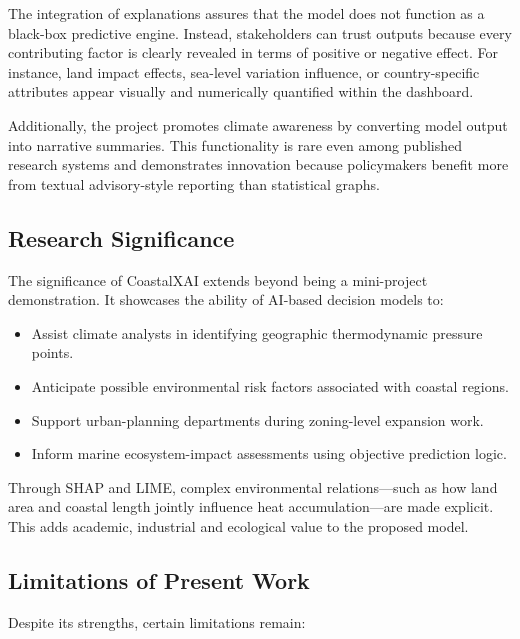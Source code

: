 \documentclass[12pt, a4paper]{article}
\begin{document}
The integration of explanations assures that the model does not function as a black-box predictive engine. Instead, stakeholders can trust outputs because every contributing factor is clearly revealed in terms of positive or negative effect. For instance, land impact effects, sea-level variation influence, or country-specific attributes appear visually and numerically quantified within the dashboard.

Additionally, the project promotes climate awareness by converting model output into narrative summaries. This functionality is rare even among published research systems and demonstrates innovation because policymakers benefit more from textual advisory-style reporting than statistical graphs.


\subsection{\textbf{Research Significance}}

The significance of CoastalXAI extends beyond being a mini-project demonstration. It showcases the ability of AI-based decision models to:

\begin{itemize}
    \item Assist climate analysts in identifying geographic thermodynamic pressure points.
    \item Anticipate possible environmental risk factors associated with coastal regions.
    \item Support urban-planning departments during zoning-level expansion work.
    \item Inform marine ecosystem-impact assessments using objective prediction logic.
\end{itemize}

Through SHAP and LIME, complex environmental relations—such as how land area and coastal length jointly influence heat accumulation—are made explicit. This adds academic, industrial and ecological value to the proposed model.


\subsection{\textbf{Limitations of Present Work}}

Despite its strengths, certain limitations remain:
\end{document}

